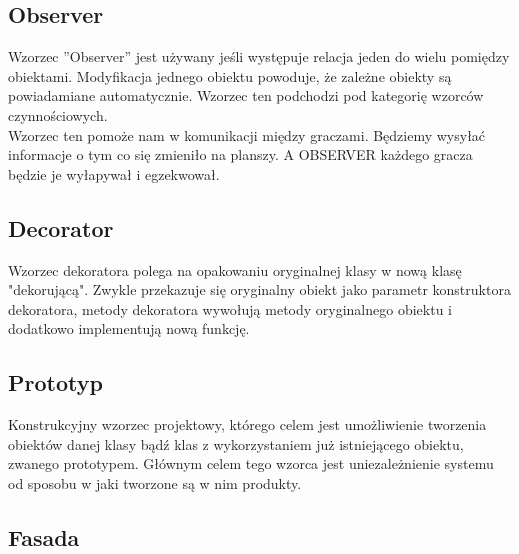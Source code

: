 \documentclass[a4paper, 11pt]{article}
\begin{document}
	\subsection{Observer}
	Wzorzec ''Observer'' jest używany jeśli występuje relacja jeden do wielu pomiędzy obiektami. Modyfikacja jednego obiektu powoduje, że zależne obiekty są powiadamiane automatycznie. Wzorzec ten podchodzi pod kategorię wzorców czynnościowych.\\
Wzorzec ten pomoże nam w komunikacji między graczami. Będziemy wysyłać informacje o tym co się zmieniło na planszy. A OBSERVER każdego gracza będzie je wyłapywał i egzekwował.

\subsection{Decorator}
Wzorzec dekoratora polega na opakowaniu oryginalnej klasy w nową klasę "dekorującą". Zwykle przekazuje się oryginalny obiekt jako parametr konstruktora dekoratora, metody dekoratora wywołują metody oryginalnego obiektu i dodatkowo implementują nową funkcję.\\

\subsection{Prototyp}
Konstrukcyjny wzorzec projektowy, którego celem jest umożliwienie tworzenia obiektów danej klasy bądź klas z wykorzystaniem już istniejącego obiektu, zwanego prototypem. Głównym celem tego wzorca jest uniezależnienie systemu od sposobu w jaki tworzone są w nim produkty.\\

\subsection{Fasada}
\end{document}
